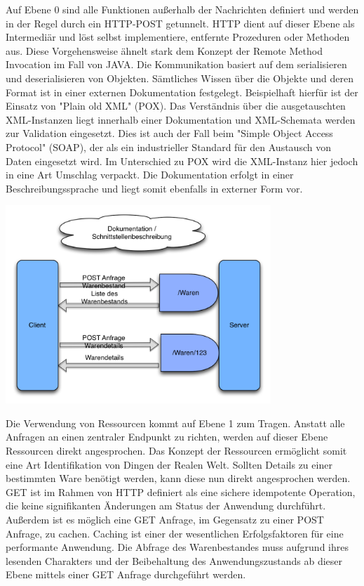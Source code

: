 Auf Ebene 0 sind alle Funktionen außerhalb der Nachrichten definiert und werden in der Regel durch ein HTTP-POST getunnelt. HTTP dient auf dieser Ebene als Intermediär und löst selbst implementiere, entfernte Prozeduren oder Methoden aus. Diese Vorgehensweise ähnelt stark dem Konzept der Remote Method Invocation im Fall von JAVA. Die Kommunikation basiert auf dem serialisieren und deserialisieren von Objekten. Sämtliches Wissen über die Objekte und deren Format ist in einer externen Dokumentation festgelegt. Beispielhaft hierfür ist der Einsatz von "Plain old XML" (POX). Das Verständnis über die ausgetauschten XML-Instanzen liegt innerhalb einer Dokumentation und XML-Schemata werden zur Validation eingesetzt. Dies ist auch der Fall beim "Simple Object Access Protocol" (SOAP), der als ein industrieller Standard für den Austausch von Daten eingesetzt wird. Im Unterschied zu POX wird die XML-Instanz hier jedoch in eine Art Umschlag verpackt. Die Dokumentation erfolgt in einer Beschreibungssprache und liegt somit ebenfalls in externer Form vor.




\begin{center}
		\includegraphics[width=10cm]{graphicx/MaturityLvL1.png}
		\label{hfaktoren}
	\end{center}
Die Verwendung von Ressourcen kommt auf Ebene 1 zum Tragen. Anstatt alle Anfragen an einen zentraler Endpunkt zu richten, werden auf dieser Ebene Ressourcen direkt angesprochen. Das Konzept der Ressourcen ermöglicht somit eine Art Identifikation von Dingen der Realen Welt. Sollten Details zu einer bestimmten Ware benötigt werden, kann diese nun direkt angesprochen werden. GET ist im Rahmen von HTTP definiert als eine sichere idempotente Operation, die keine signifikanten Änderungen am Status der Anwendung durchführt. Außerdem ist es möglich eine GET Anfrage, im Gegensatz zu einer POST Anfrage, zu cachen. Caching ist einer der wesentlichen Erfolgsfaktoren für eine performante Anwendung. Die Abfrage des Warenbestandes muss aufgrund ihres lesenden Charakters und der Beibehaltung des Anwendungszustands ab dieser Ebene mittels einer GET Anfrage durchgeführt werden. 




